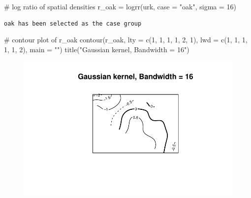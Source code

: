 \documentclass[
  letterpaper,
  DIV=11,
  numbers=noendperiod]{scrartcl}
\newenvironment{Shaded}{\begin{snugshade}}{\end{snugshade}}
\newcommand{\AttributeTok}[1]{\textcolor[rgb]{0.40,0.45,0.13}{#1}}
\newcommand{\CommentTok}[1]{\textcolor[rgb]{0.37,0.37,0.37}{#1}}
\newcommand{\DecValTok}[1]{\textcolor[rgb]{0.68,0.00,0.00}{#1}}
\newcommand{\FunctionTok}[1]{\textcolor[rgb]{0.28,0.35,0.67}{#1}}
\newcommand{\NormalTok}[1]{\textcolor[rgb]{0.00,0.23,0.31}{#1}}
\newcommand{\OtherTok}[1]{\textcolor[rgb]{0.00,0.23,0.31}{#1}}
\newcommand{\StringTok}[1]{\textcolor[rgb]{0.13,0.47,0.30}{#1}}
\begin{document}
\begin{Shaded}
\begin{Highlighting}[]
\CommentTok{\# log ratio of spatial densities}
\NormalTok{r\_oak }\OtherTok{=} \FunctionTok{logrr}\NormalTok{(urk, }\AttributeTok{case =} \StringTok{"oak"}\NormalTok{, }\AttributeTok{sigma =} \DecValTok{16}\NormalTok{)}
\end{Highlighting}
\end{Shaded}

\begin{verbatim}
oak has been selected as the case group
\end{verbatim}

\begin{Shaded}
\begin{Highlighting}[]
\CommentTok{\# contour plot of r\_oak}
\FunctionTok{contour}\NormalTok{(r\_oak, }\AttributeTok{lty =} \FunctionTok{c}\NormalTok{(}\DecValTok{1}\NormalTok{, }\DecValTok{1}\NormalTok{, }\DecValTok{1}\NormalTok{, }\DecValTok{1}\NormalTok{, }\DecValTok{2}\NormalTok{, }\DecValTok{1}\NormalTok{),}
        \AttributeTok{lwd =} \FunctionTok{c}\NormalTok{(}\DecValTok{1}\NormalTok{, }\DecValTok{1}\NormalTok{, }\DecValTok{1}\NormalTok{, }\DecValTok{1}\NormalTok{, }\DecValTok{1}\NormalTok{, }\DecValTok{2}\NormalTok{), }\AttributeTok{main =} \StringTok{""}\NormalTok{)}
\FunctionTok{title}\NormalTok{(}\StringTok{"Gaussian kernel, Bandwidth = 16"}\NormalTok{)}
\end{Highlighting}
\end{Shaded}

\begin{figure}[H]

{\centering \includegraphics{cc-r-kd-hw_files/figure-pdf/unnamed-chunk-3-1.pdf}

}

\end{figure}
\end{document}
